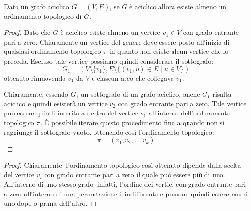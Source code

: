 \begin{propbox}
		Dato un grafo aciclico $G=(V,E)$, se $G$ è aciclico allora esiste almeno un ordinamento topologico di $G$.
\end{propbox}


\begin{proof}
	Dato che $G$ è aciclico esiste almeno un vertice $v_{1} \in V$ con grado entrante pari a zero. Chiaramente un vertice del genere deve essere posto all'inizio di qualsiasi ordinamento topologico $\pi$ in quanto non esiste alcun vertice che lo preceda. Escluso tale vertice possiamo quindi considerare il sottografo: $$G_{1}=(V\setminus\{v_{1}\},E \setminus \{(v_{1},u)\in E \; | \; u \in V\})$$ ottenuto rimuovendo $v_{1}$ da $V$ e ciascun arco che collegava $v_{1}$.
\begin{center}
\end{center}
Chiaramente, essendo $G_{1}$ un sottografo di un grafo aciclico, anche $G_{1}$ risulta aciclico e quindi esisterà un vertice $v_{2}$ con grado entrante pari a zero. Tale vertice può essere quindi inserito a destra del vertice $v_{1}$ all'interno dell'ordinamento topologico $\pi$. È possibile iterare questo procedimento fino a quando non si raggiunge il sottografo vuoto, ottenendo così l'ordinamento topologico:
\[\pi = (v_{1},v_{2},\ldots, v_{k})\]
\end{proof}


\begin{proof}
	Chiaramente, l'ordinamento topologico così ottenuto dipende dalla scelta del vertice $v_{i}$ con grado entrante pari a zero il quale può essere più di uno. All'interno di uno stesso grafo, infatti, l'ordine dei vertici con grado entrante pari a zero all'interno di una permutazione è indifferente e possono quindi essere messi uno dopo o prima dell'altro.
\end{proof}

